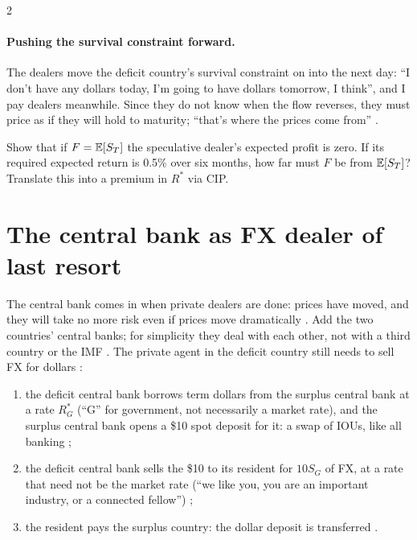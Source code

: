 \begin{paracol}{2}
\paragraph{Pushing the survival constraint forward.} The dealers move the deficit country's survival constraint on into the next day: ``I don't have any dollars today,
I'm going to have dollars tomorrow, I think'', and I pay dealers meanwhile. Since they do not know when the flow reverses, they must price as if they will hold to
maturity; ``that's where the prices come from'' .

\begin{exercise}
Show that if $F=\mathbb{E}[S_T]$ the speculative dealer's expected profit is zero. If its required expected return is 0.5\% over six months, how far must $F$ be from
$\mathbb{E}[S_T]$? Translate this into a premium in $R^\ast$ via CIP.
\end{exercise}

\section{The central bank as FX dealer of last resort}\label{sec:fx-cb}

The central bank comes in when private dealers are done: prices have moved, and they will take no more risk even if prices move dramatically
. Add the two countries' central banks; for simplicity they deal with each other, not with a third country or the IMF
. The private agent in the deficit country still needs to sell FX for dollars :
\begin{enumerate}
  \item the deficit central bank borrows term dollars from the surplus central bank at a rate $R^\ast_G$ (``G'' for government, not necessarily a market rate),
        and the surplus central bank opens a \$10 spot deposit for it: a swap of IOUs, like all banking ;
  \item the deficit central bank sells the \$10 to its resident for $10S_G$ of FX, at a rate that need not be the market rate (``we like you, you are an important
        industry, or a connected fellow'') ;
  \item the resident pays the surplus country: the dollar deposit is transferred .
\end{enumerate}


\end{paracol}
